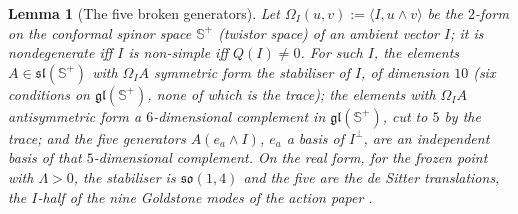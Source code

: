 \documentclass[11pt]{article}
\newtheorem{lemma}[theorem]{Lemma}
\theoremstyle{definition}
\theoremstyle{plain}
\newcommand{\changedmark}[2]{\marginpar{\raggedright\scriptsize\color{#1}#2}}
\providecommand{\CS}{}\renewcommand{\CS}{{\mathbb{S}^{+}}}
\providecommand{\ip}{}\renewcommand{\ip}[2]{\langle #1, #2\rangle}
\begin{document}
\begin{lemma}[The five broken generators]\label{c:mass.five-broken-generators}
\changedmark{gray}{reworded}
Let $\Omega_{I}(u,v) := \ip{I}{u\wedge v}$ be the $2$-form on the conformal spinor space $\CS$ (twistor space) of an ambient vector $I$; it is nondegenerate iff $I$ is non-simple iff $Q(I) \neq 0$. For such $I$, the elements $A \in \mathfrak{sl}(\CS)$ with $\Omega_{I}A$ symmetric form the stabiliser of $I$, of dimension $10$ (six conditions on $\mathfrak{gl}(\CS)$, none of which is the trace); the elements with $\Omega_{I}A$ antisymmetric form a $6$-dimensional complement in $\mathfrak{gl}(\CS)$, cut to $5$ by the trace; and the five generators $A(e_{a}\wedge I)$, $e_{a}$ a basis of $I^{\perp}$, are an independent basis of that $5$-dimensional complement. On the real form, for the frozen point with $\Lambda > 0$, the stabiliser is $\mathfrak{so}(1,4)$ and the five are the de Sitter translations, the $I$-half of the nine Goldstone modes of the action paper \cite[Prop.~5.4]{ButlerT10}.
\end{lemma}
\end{document}
